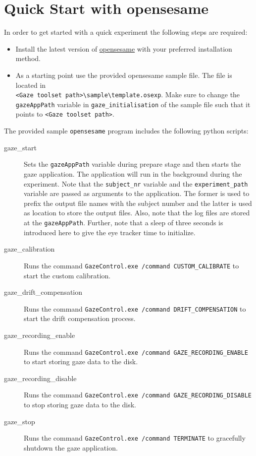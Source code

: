 \documentclass[a4paper,oneside]{book}
\begin{document}
\section{Quick Start with opensesame}
\label{sec.quick.opensesame}
In order to get started with a quick experiment the following steps are required:
\begin{itemize}
    \item Install the latest version of \href{https://osdoc.cogsci.nl/3.3/download/}{opensesame} with your preferred installation method.
    \item As a starting point use the provided opensesame sample file.
        The file is located in\\ \texttt{<Gaze toolset path>\textbackslash sample\textbackslash template.osexp}.
        Make sure to change the \texttt{gazeAppPath} variable in \texttt{gaze\_initialisation} of the sample file such that it points to \texttt{<Gaze toolset path>}.
\end{itemize}

The provided sample \texttt{opensesame} program includes the following python scripts:
\begin{description}
    \item[gaze\_start]
        Sets the \texttt{gazeAppPath} variable during prepare stage and then starts the gaze application.
        The application will run in the background during the experiment.
        Note that the \texttt{subject\_nr} variable and the \texttt{experiment\_path} variable are passed as arguments to the application.
        The former is used to prefix the output file names with the subject number and the latter is used as location to store the output files.
        Also, note that the log files are stored at the \texttt{gazeAppPath}.
        Further, note that a sleep of three seconds is introduced here to give the eye tracker time to initialize.
    \item[gaze\_calibration]
        Runs the command \texttt{GazeControl.exe /command CUSTOM\_CALIBRATE} to start the custom calibration.
    \item[gaze\_drift\_compensation]
        Runs the command \texttt{GazeControl.exe /command DRIFT\_COMPENSATION} to start the drift compensation process.
    \item[gaze\_recording\_enable]
        Runs the command \texttt{GazeControl.exe /command GAZE\_RECORDING\_ENABLE} to start storing gaze data to the disk.
    \item[gaze\_recording\_disable]
        Runs the command \texttt{GazeControl.exe /command GAZE\_RECORDING\_DISABLE} to stop storing gaze data to the disk.
    \item[gaze\_stop]
        Runs the command \texttt{GazeControl.exe /command TERMINATE} to gracefully shutdown the gaze application.
\end{description}
\end{document}
